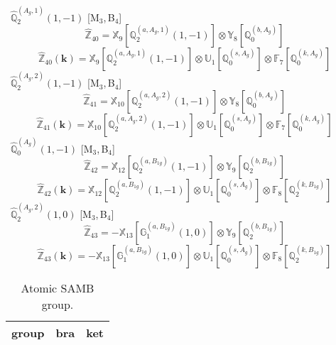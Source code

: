 \documentclass[fleqn,10pt,landscape]{article}
\begin{document}
\begin{itemize}
\vspace{4mm}
\noindent {} $\,\,\,\hat{\mathbb{Q}}_{2}^{(A_{g},1)}(1,-1)$ [M$_{3}$,\,B$_{4}$]
\begin{dmath*}
\hat{\mathbb{Z}}_{40}=\mathbb{X}_{9}[\mathbb{Q}_{2}^{(a,A_{g},1)}(1,-1)] \otimes\mathbb{Y}_{8}[\mathbb{Q}_{0}^{(b,A_{g})}]
\end{dmath*}
\begin{dmath*}
\hat{\mathbb{Z}}_{40}(\bm{k})=\mathbb{X}_{9}[\mathbb{Q}_{2}^{(a,A_{g},1)}(1,-1)] \otimes\mathbb{U}_{1}[\mathbb{Q}_{0}^{(s,A_{g})}] \otimes\mathbb{F}_{7}[\mathbb{Q}_{0}^{(k,A_{g})}]
\end{dmath*}
\vspace{4mm}
\noindent {} $\,\,\,\hat{\mathbb{Q}}_{2}^{(A_{g},2)}(1,-1)$ [M$_{3}$,\,B$_{4}$]
\begin{dmath*}
\hat{\mathbb{Z}}_{41}=\mathbb{X}_{10}[\mathbb{Q}_{2}^{(a,A_{g},2)}(1,-1)] \otimes\mathbb{Y}_{8}[\mathbb{Q}_{0}^{(b,A_{g})}]
\end{dmath*}
\begin{dmath*}
\hat{\mathbb{Z}}_{41}(\bm{k})=\mathbb{X}_{10}[\mathbb{Q}_{2}^{(a,A_{g},2)}(1,-1)] \otimes\mathbb{U}_{1}[\mathbb{Q}_{0}^{(s,A_{g})}] \otimes\mathbb{F}_{7}[\mathbb{Q}_{0}^{(k,A_{g})}]
\end{dmath*}
\vspace{4mm}
\noindent {} $\,\,\,\hat{\mathbb{Q}}_{0}^{(A_{g})}(1,-1)$ [M$_{3}$,\,B$_{4}$]
\begin{dmath*}
\hat{\mathbb{Z}}_{42}=\mathbb{X}_{12}[\mathbb{Q}_{2}^{(a,B_{1g})}(1,-1)] \otimes\mathbb{Y}_{9}[\mathbb{Q}_{2}^{(b,B_{1g})}]
\end{dmath*}
\begin{dmath*}
\hat{\mathbb{Z}}_{42}(\bm{k})=\mathbb{X}_{12}[\mathbb{Q}_{2}^{(a,B_{1g})}(1,-1)] \otimes\mathbb{U}_{1}[\mathbb{Q}_{0}^{(s,A_{g})}] \otimes\mathbb{F}_{8}[\mathbb{Q}_{2}^{(k,B_{1g})}]
\end{dmath*}
\vspace{4mm}
\noindent {} $\,\,\,\hat{\mathbb{Q}}_{2}^{(A_{g},2)}(1,0)$ [M$_{3}$,\,B$_{4}$]
\begin{dmath*}
\hat{\mathbb{Z}}_{43}=- \mathbb{X}_{13}[\mathbb{G}_{1}^{(a,B_{1g})}(1,0)] \otimes\mathbb{Y}_{9}[\mathbb{Q}_{2}^{(b,B_{1g})}]
\end{dmath*}
\begin{dmath*}
\hat{\mathbb{Z}}_{43}(\bm{k})=- \mathbb{X}_{13}[\mathbb{G}_{1}^{(a,B_{1g})}(1,0)] \otimes\mathbb{U}_{1}[\mathbb{Q}_{0}^{(s,A_{g})}] \otimes\mathbb{F}_{8}[\mathbb{Q}_{2}^{(k,B_{1g})}]
\end{dmath*}
\begin{center}
\renewcommand{\arraystretch}{1.3}
\begin{longtable}{c|c|c}
\caption{Atomic SAMB group.}
 \\
 \hline \hline
group & bra & ket \\ \hline \endfirsthead


\end{longtable}
\end{center}
\end{itemize}
\end{document}
